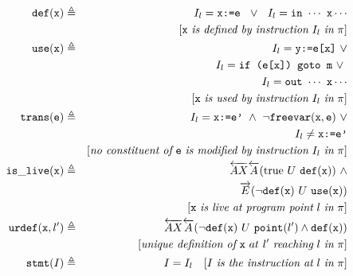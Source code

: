 \begin{figure}[!ht]
\vspace{-3mm}
\begin{small}
\begin{eqnarray*}
\wdef(\wx) & \triangleq & I_l= \texttt{x:=e} ~~ \vee ~~ I_l= \texttt{in} ~ \cdots ~ \texttt{x} \cdots \\
                            &            & [\wx ~ \textit{is defined by instruction} ~ I_l ~ \textit{in} ~ \pi] \\
\wuse(\wx) & \triangleq & I_l= \texttt{y:=e[x]} ~ \vee  \\
                            &            & I_l= \texttt{if (e[x]) goto m} ~ \vee \ \\
                            &            & I_l= \texttt{out} ~ \cdots ~ \texttt{x} \cdots \\
                            &            & [\wx ~ \textit{is used by instruction} ~ I_l ~ \textit{in} ~ \pi] \\
\wtrans(\we) & \triangleq & I_l= \texttt{x:=e'} ~ \wedge ~ \neg\wfreevar(\wx,\we) ~ \vee \\
                            &            & I_l\neq\texttt{x:=e'} \\
                            &            & [\textit{no constituent of}~\we~\textit{is modified by instruction} ~ I_l ~ \textit{in} ~ \pi] \\
\islive(\wx) & \triangleq & \overleftarrow{AX}\overleftarrow{A}(\text{true} ~ U ~ \wdef(\wx)) ~ \wedge \\
                            &            & \overrightarrow{E}(\neg\wdef(\wx) ~ U ~ \wuse(\wx)) \\
                            &            & [\wx ~ \textit{is live at program point} ~ l ~ \textit{in} ~ \pi] \\
\ureachdef(\wx,l') & \triangleq & \overleftarrow{AX}\overleftarrow{A}(\neg\wdef(\wx) ~ U ~ \point(l')\wedge\wdef(\wx)) \\
                            &            & [\textit{unique definition of}~\wx~{at}~l'~\textit{reaching}~l~\textit{in} ~ \pi] \\
\stmt(I) & \triangleq & I=I_l ~~~ [I ~ \textit{is the instruction at} ~ l ~ \textit{in} ~ \pi]\\

\end{eqnarray*}
\end{small}
\end{figure}
